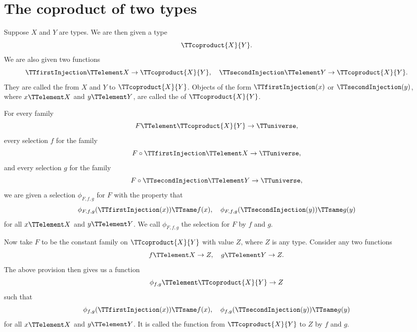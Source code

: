 \documentclass{article}
\begin{document}
\section{The coproduct of two types}
\label{sec:coproduct-two-types}

Suppose $X$ and $Y$ are types.  We are then given a type
\begin{equation*}
  \TTcoproduct{X}{Y}.
\end{equation*}
We are also given two functions
\begin{equation*}
  \TTfirstInjection
  \TTelement
  X \to \TTcoproduct{X}{Y}, \quad
  \TTsecondInjection
  \TTelement
  Y \to \TTcoproduct{X}{Y}.
\end{equation*}
They are called the  from $X$ and $Y$
to $\TTcoproduct{X}{Y}$.  Objects of the form $\TTfirstInjection(x)$
or $\TTsecondInjection(y)$, where $x \TTelement X$ and
$y \TTelement Y$, are called the  of
$\TTcoproduct{X}{Y}$.

For every family
\begin{equation*}
  F \TTelement \TTcoproduct{X}{Y} \to \TTuniverse,
\end{equation*}
every selection $f$ for the family
\begin{equation*}
  F \circ \TTfirstInjection \TTelement X \to \TTuniverse,
\end{equation*}
and every selection $g$ for the family
\begin{equation*}
  F \circ \TTsecondInjection \TTelement Y \to \TTuniverse,
\end{equation*}
we are given a selection $\phi_{F,f,g}$ for $F$ with the property that
\begin{equation*}
  \phi_{F,f,g} (\TTfirstInjection(x)) \TTsame f(x), \quad
  \phi_{F,f,g} (\TTsecondInjection(y)) \TTsame g(y)
\end{equation*}
for all $x \TTelement X$ and $y \TTelement Y$.  We call $\phi_{F,f,g}$
the selection for $F$  by $f$ and $g$.

Now take $F$ to be the constant family on $\TTcoproduct{X}{Y}$ with
value $Z$, where $Z$ is any type.  Consider any two functions
\begin{equation*}
  f \TTelement X \to Z, \quad
  g \TTelement Y \to Z.
\end{equation*}
The above provision then gives us a function
\begin{equation*}
  \phi_{f,g} \TTelement \TTcoproduct{X}{Y} \to Z
\end{equation*}
such that
\begin{equation*}
  \phi_{f,g} (\TTfirstInjection(x)) \TTsame f(x), \quad
  \phi_{f,g} (\TTsecondInjection(y)) \TTsame g(y)
\end{equation*}
for all $x \TTelement X$ and $y \TTelement Y$.  It is called the
function from $\TTcoproduct{X}{Y}$ to $Z$  by $f$
and $g$.
\end{document}
